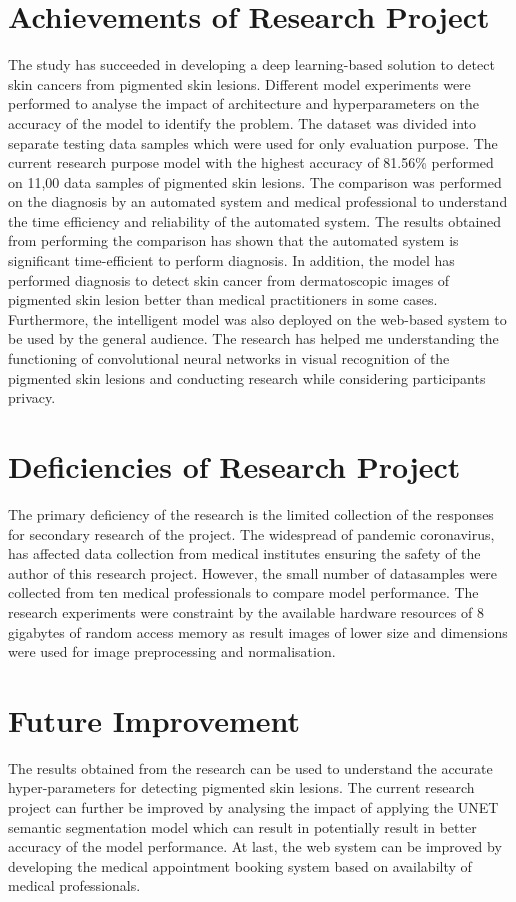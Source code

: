 \section{Achievements of Research Project}
The study has succeeded in developing a deep learning-based solution to detect skin cancers from pigmented skin lesions.
Different model experiments were performed to analyse the impact of architecture and hyperparameters on the accuracy of the model to identify the problem. 
The dataset was divided into separate testing data samples which were used for only evaluation purpose. The current research purpose model with the highest accuracy of 81.56\% performed on 11,00 data samples of pigmented skin lesions. 
The comparison was performed on the diagnosis by an automated system and medical professional to understand the time efficiency and reliability of the automated system. 
The results obtained from performing the comparison has shown that the automated system is significant time-efficient to perform diagnosis. 
In addition, the model has performed diagnosis to detect skin cancer from dermatoscopic images of pigmented skin lesion better than medical practitioners in some cases.
Furthermore, the intelligent model was also deployed on the web-based system to be used by the general audience. 
The research has helped me understanding the functioning of convolutional neural networks in visual recognition of the pigmented skin lesions
and conducting research while considering participants privacy.

\section{Deficiencies of Research Project}
The primary deficiency of the research is the limited collection of the responses for secondary research of the project. 
The widespread of pandemic coronavirus, has affected data collection from medical institutes ensuring the safety of the author of this research project. 
However, the small number of datasamples were collected from ten medical professionals to compare model performance.
The research experiments were constraint by the available hardware resources of 8 gigabytes of random access memory as result images of lower size and dimensions were used for image preprocessing and normalisation.

\section{Future Improvement}
The results obtained from the research can be used to understand the accurate hyper-parameters for detecting pigmented skin lesions. 
The current research project can further be improved by analysing the impact of applying the UNET semantic segmentation model which can result in potentially result in better accuracy of the model performance.
At last, the web system can be improved by developing the medical appointment booking system based on availabilty of medical professionals.
